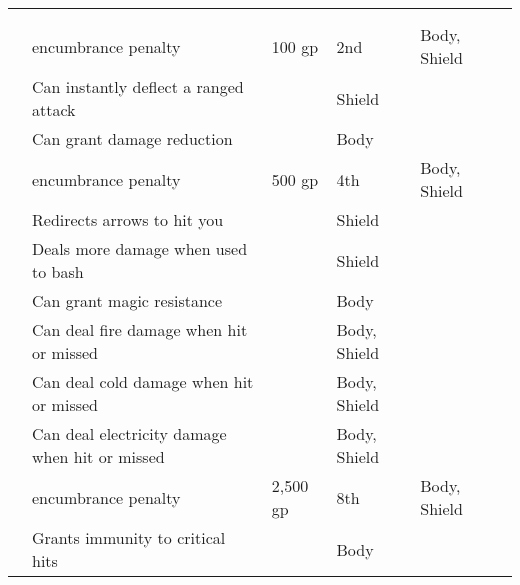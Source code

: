         \begin{longtabuwrapper}
            \begin{longtabu}{l X l l l l}
                \\
                 &  &  &  &  &  \\
                  &  encumbrance penalty & 100 gp & 2nd & Body, Shield &  \\
                 & Can instantly deflect a ranged attack &  & Shield &  \\
                 & Can grant damage reduction &  & Body &  \\
                  &  encumbrance penalty & 500 gp & 4th & Body, Shield &  \\
                 & Redirects arrows to hit you &  & Shield &  \\
                 & Deals more damage when used to bash &  & Shield &  \\
                 & Can grant magic resistance &  & Body &  \\
                 & Can deal fire damage when hit or missed &  & Body, Shield &  \\
                 & Can deal cold damage when hit or missed &  & Body, Shield &  \\
                 & Can deal electricity damage when hit or missed &  & Body, Shield &  \\
                  &  encumbrance penalty & 2,500 gp & 8th & Body, Shield &  \\
                 & Grants immunity to critical hits &  & Body &  \\

\end{longtabu}
\end{longtabuwrapper}
